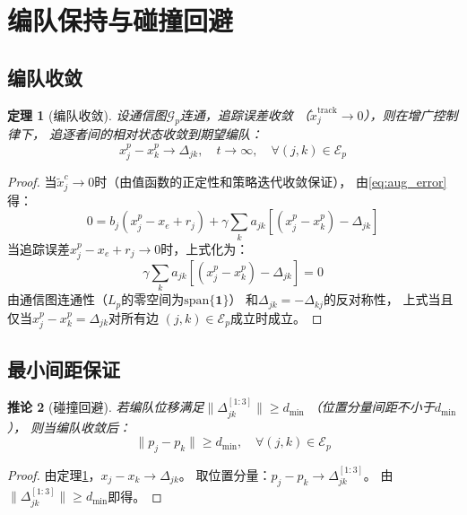 \documentclass[11pt,a4paper]{article}
\newtheorem{theorem}{定理}
\newtheorem{corollary}[theorem]{推论}
\begin{document}
\section{编队保持与碰撞回避}

\subsection{编队收敛}

\begin{theorem}[编队收敛]\label{thm:formation}
  设通信图$\mathcal{G}_p$连通，追踪误差收敛
  （$\tilde{x}_j^{\mathrm{track}} \to 0$），则在增广控制律下，
  追逐者间的相对状态收敛到期望编队：
  \begin{equation}
    x_j^p - x_k^p \to \Delta_{jk}, \quad t \to \infty,
    \quad \forall (j,k) \in \mathcal{E}_p
  \end{equation}
\end{theorem}

\begin{proof}
  当$\tilde{x}_j^c \to 0$时（由值函数的正定性和策略迭代收敛保证），
  由\eqref{eq:aug_error}得：
  \[
    0 = b_j(x_j^p - x_e + r_j)
    + \gamma \sum_k a_{jk}[(x_j^p - x_k^p) - \Delta_{jk}]
  \]
  当追踪误差$x_j^p - x_e + r_j \to 0$时，上式化为：
  \[
    \gamma \sum_k a_{jk}[(x_j^p - x_k^p) - \Delta_{jk}] = 0
  \]
  由通信图连通性（$L_p$的零空间为$\text{span}\{\mathbf{1}\}$）
  和$\Delta_{jk} = -\Delta_{kj}$的反对称性，
  上式当且仅当$x_j^p - x_k^p = \Delta_{jk}$对所有边
  $(j,k) \in \mathcal{E}_p$成立时成立。
\end{proof}

\subsection{最小间距保证}

\begin{corollary}[碰撞回避]\label{cor:collision}
  若编队位移满足$\|\Delta_{jk}^{[1:3]}\| \geq d_{\min}$
  （位置分量间距不小于$d_{\min}$），
  则当编队收敛后：
  \begin{equation}
    \|p_j - p_k\| \geq d_{\min}, \quad \forall (j,k) \in \mathcal{E}_p
  \end{equation}
\end{corollary}

\begin{proof}
  由定理\ref{thm:formation}，$x_j - x_k \to \Delta_{jk}$。
  取位置分量：$p_j - p_k \to \Delta_{jk}^{[1:3]}$。
  由$\|\Delta_{jk}^{[1:3]}\| \geq d_{\min}$即得。
\end{proof}
\end{document}
